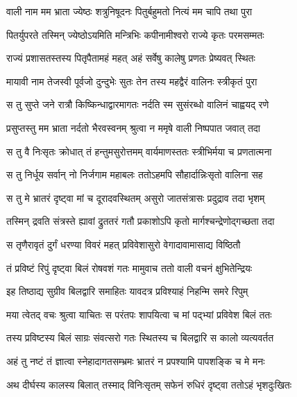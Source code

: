
\twolineshloka
{वाली नाम मम भ्राता ज्येष्ठः शत्रुनिषूदनः}
{पितुर्बहुमतो नित्यं मम चापि तथा पुरा} %

\twolineshloka
{पितर्युपरते तस्मिन् ज्येष्ठोऽयमिति मन्त्रिभिः}
{कपीनामीश्वरो राज्ये कृतः परमसम्मतः} %

\twolineshloka
{राज्यं प्रशासतस्तस्य पितृपैतामहं महत्}
{अहं सर्वेषु कालेषु प्रणतः प्रेष्यवत् स्थितः} %

\twolineshloka
{मायावी नाम तेजस्वी पूर्वजो दुन्दुभेः सुतः}
{तेन तस्य महद्वैरं वालिनः स्त्रीकृतं पुरा} %

\twolineshloka
{स तु सुप्ते जने रात्रौ किष्किन्धाद्वारमागतः}
{नर्दति स्म सुसंरब्धो वालिनं चाह्वयद् रणे} %

\twolineshloka
{प्रसुप्तस्तु मम भ्राता नर्दतो भैरवस्वनम्}
{श्रुत्वा न ममृषे वाली निष्पपात जवात् तदा} %

\twolineshloka
{स तु वै निःसृतः क्रोधात् तं हन्तुमसुरोत्तमम्}
{वार्यमाणस्ततः स्त्रीभिर्मया च प्रणतात्मना} %

\twolineshloka
{स तु निर्धूय सर्वान् नो निर्जगाम महाबलः}
{ततोऽहमपि सौहार्दान्निःसृतो वालिना सह} %

\twolineshloka
{स तु मे भ्रातरं दृष्ट्वा मां च दूरादवस्थितम्}
{असुरो जातसंत्रासः प्रदुद्राव तदा भृशम्} %

\twolineshloka
{तस्मिन् द्रवति संत्रस्ते ह्यावां द्रुततरं गतौ}
{प्रकाशोऽपि कृतो मार्गश्चन्द्रेणोद्गच्छता तदा} %

\twolineshloka
{स तृणैरावृतं दुर्गं धरण्या विवरं महत्}
{प्रविवेशासुरो वेगादावामासाद्य विष्ठितौ} %

\twolineshloka
{तं प्रविष्टं रिपुं दृष्ट्वा बिलं रोषवशं गतः}
{मामुवाच ततो वाली वचनं क्षुभितेन्द्रियः} %

\twolineshloka
{इह तिष्ठाद्य सुग्रीव बिलद्वारि समाहितः}
{यावदत्र प्रविश्याहं निहन्मि समरे रिपुम्} %

\twolineshloka
{मया त्वेतद् वचः श्रुत्वा याचितः स परंतपः}
{शापयित्वा च मां पद्भ्यां प्रविवेश बिलं ततः} %

\twolineshloka
{तस्य प्रविष्टस्य बिलं साग्रः संवत्सरो गतः}
{स्थितस्य च बिलद्वारि स कालो व्यत्यवर्तत} %

\twolineshloka
{अहं तु नष्टं तं ज्ञात्वा स्नेहादागतसम्भ्रमः}
{भ्रातरं न प्रपश्यामि पापशङ्कि च मे मनः} %

\twolineshloka
{अथ दीर्घस्य कालस्य बिलात् तस्माद् विनिःसृतम्}
{सफेनं रुधिरं दृष्ट्वा ततोऽहं भृशदुःखितः} %

